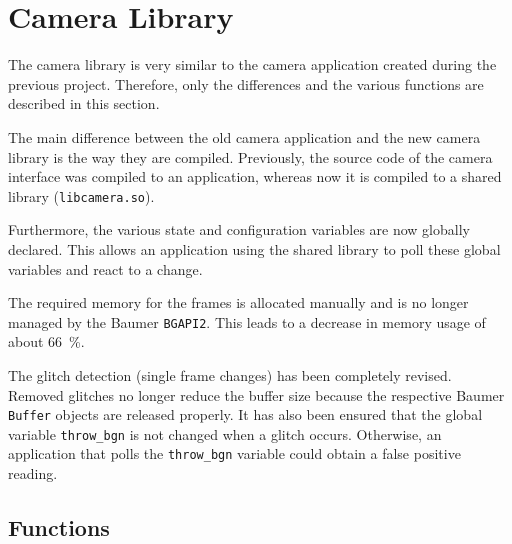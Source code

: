 \section{Camera Library}
\label{sec:inference:camera_library}

The camera library is very similar to the camera application created during the previous project.
Therefore, only the differences and the various functions are described in this section.

The main difference between the old camera application and the new camera library is the way they are compiled.
Previously, the source code of the camera interface was compiled to an application, whereas now it is compiled to a shared library (\texttt{libcamera.so}).

Furthermore, the various state and configuration variables are now globally declared.
This allows an application using the shared library to poll these global variables and react to a change.

The required memory for the frames is allocated manually and is no longer managed by the Baumer \texttt{BGAPI2}.
This leads to a decrease in memory usage of about \SI{66}{\percent}.

The glitch detection (single frame changes) has been completely revised.
Removed glitches no longer reduce the buffer size because the respective Baumer \texttt{Buffer} objects are released properly.
It has also been ensured that the global variable \texttt{throw\_bgn} is not changed when a glitch occurs.
Otherwise, an application that polls the \texttt{throw\_bgn} variable could obtain a false positive reading.

\subsection{Functions}
\label{subsec:inference:camera_library:functions}

